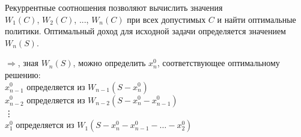 \documentclass[17pt]{extarticle}
\begin{document}
Рекуррентные соотношения позволяют вычислить значения \\ \( W_1(C) \), \( W_2(C) \), ..., \( W_n(C) \)
при всех допустимых \( C \) и найти оптимальные политики. Оптимальный доход для исходной задачи определяется значением \( W_n(S) \).

$\Rightarrow$, зная $W_n(S)$, можно определить $x_n^0$, соответствующее оптимальному решению: \\
\( x_{n-1}^0 \) определяется из \( W_{n-1}(S - x_n^0) \) \\
\( x_{n-2}^0 \) определяется из \( W_{n-2}(S - x_n^0 - x_{n-1}^0) \) \\
\vdots \\
\( x_1^0 \) определяется из \( W_1(S - x_n^0 - x_{n-1}^0 - \ldots - x_2^0) \) \\
\end{document}
